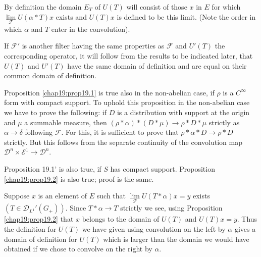 By definition the domain $E_T$ of $U(T)$ will consist of those $x$ in
$E$ for which $\lim\limits_{\mathscr{F}}U(\alpha *T)x$ exists and
$U(T)x$ is defined to be this limit. (Note the order in which $\alpha$
and $T$ enter in the convolution).

\begin{remark*}
If $\mathscr{F}'$ is another filter having the same properties as
$\mathscr{F}$ and $U'(T)$ the corresponding operator, it will follow
from the results to be indicated later, that $U(T)$ and $U'(T)$ have
the same domain of definition and are equal on their common domain of
definition.

Proposition \ref{chap19:prop19.1} is true also in the non-abelian
case, if $\rho$ is a $C^\infty$ form with compact support. To uphold
this proposition in the non-abelian case we have to prove the
following: if $D$ is a distribution with support at the origin and
$\mu$ a summable measure, then $(\rho *\alpha)*(D *\mu)\to\rho
*D*\mu$ strictly as $\alpha\to\delta$ following $\mathscr{F}$. For
this, it is sufficient to prove that $\rho *\alpha *D\to\rho *D$
strictly. But this follows from the separate continuity of the
convolution map $\mathscr{D}^n\times\mathcal{E}^1\to\mathscr{D}^n$. 

Proposition 19.1' is also true, if $S$ has compact
support. Proposition \ref{chap19:prop19.2} is also true; proof is the
same.

Suppose $x$ is an element of $E$ such that $\lim\limits_{\mathscr{F}}U
(T*\alpha)x=y$ exists $(T\in\mathscr{D}_{L^1}'(G_+))$. Since
$T*\alpha\to T$ strictly we see, using Proposition
\ref{chap19:prop19.2} that $x$ belongs to the domain of $U(T)$ and
$U(T)x=y$. Thus the definition for $U(T)$ we have given using
convolution on the left by $\alpha$ gives a domain of definition for
$U(T)$ which is larger than the domain we would have obtained if we
chose to convolve on the right by $\alpha$. 
\end{remark*}
